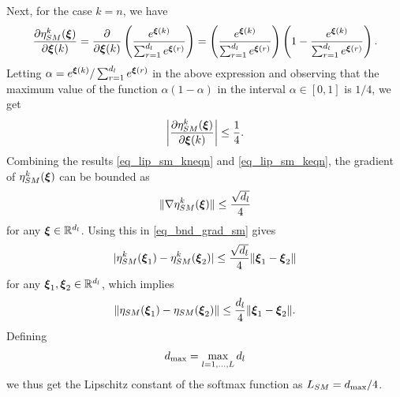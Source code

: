 \documentclass[review,supplement,onefignum,onetabnum]{siamonline250211}
\begin{document}
Next, for the case $k= n$, we have
%
\begin{equation*}
\begin{split}
\frac{\partial \eta_{SM}^k (\boldsymbol{\xi})  }{\partial \boldsymbol{\xi}(k)} 
=  \frac{\partial }{\partial \boldsymbol{\xi}(k)} 
\left( \frac{e^{\boldsymbol{\xi}(k)}}{ \sum_{r=1}^{{d_l}} e^{\boldsymbol{\xi}(r)}} \right)
= \left( \frac{e^{\boldsymbol{\xi}(k)}}{ \sum_{r=1}^{{d_l}} e^{\boldsymbol{\xi}(r)}} \right) \left( 1- \frac{e^{\boldsymbol{\xi}(k)}}{ \sum_{r=1}^{{d_l}} e^{\boldsymbol{\xi}(r)}} \right).
\end{split}
\end{equation*}
%
Letting $\alpha =  e^{\boldsymbol{\xi}(k)} / \sum_{r=1}^{{d_l}} e^{\boldsymbol{\xi}(r)}  $ in the above expression and observing that the maximum value of the function $\alpha (1-\alpha)$ in the interval $\alpha \in [0,1]$ is $1/4$, we get
%
\begin{equation}
\label{eq_lip_sm_keqn}
\begin{split}
\left | \frac{\partial \eta_{SM}^k (\boldsymbol{\xi})  }{\partial \boldsymbol{\xi}(k)} \right |
\leq \frac{1}{4}.
\end{split}
\end{equation}
%
Combining the results \eqref{eq_lip_sm_kneqn} and \eqref{eq_lip_sm_keqn}, the gradient of $ \eta_{SM}^k (\boldsymbol{\xi})   $  can be bounded as
%
\begin{equation*}
\begin{split}
\| \nabla \eta_{SM}^k (\boldsymbol{\xi})   \|   \leq \frac{\sqrt{{d_l}}}{4}
\end{split}
\end{equation*}
%
for any $\boldsymbol{\xi} \in \mathbb{R}^{d_l}$. Using this in \eqref{eq_bnd_grad_sm} gives
%
\[
| \eta_{SM}^k(\boldsymbol{\xi}_1) - \eta_{SM}^k(\boldsymbol{\xi}_2) |  \leq \frac{\sqrt{{d_l}}}{4}  \| \boldsymbol{\xi}_1 - \boldsymbol{\xi}_2 \|
\]
for any $\boldsymbol{\xi}_1, \boldsymbol{\xi}_2 \in \mathbb{R}^{d_l}$, which implies
%
\begin{equation*}
\begin{split}
\|  \eta_{SM}(\boldsymbol{\xi}_1) - \eta_{SM}(\boldsymbol{\xi}_2)  \| \leq \frac{{d_l}}{4} \| \boldsymbol{\xi}_1 - \boldsymbol{\xi}_2 \|.
\end{split}
\end{equation*}
%
Defining
%
\begin{equation*}
\begin{split}
{d_{\max}}=\max_{l=1, \dots, L} {d_l}
\end{split}
\end{equation*}
%
we thus get the Lipschitz constant of the softmax function as $L_{SM} ={d_{\max}}/4$. 
\end{document}
